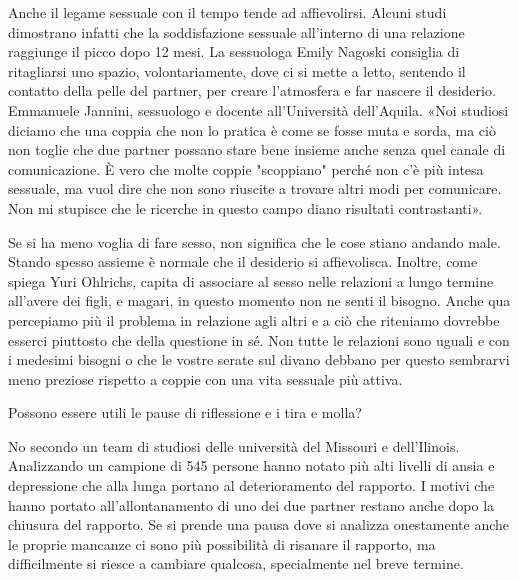\documentclass[12pt]{book} %
\begin{document}
Anche il legame sessuale con il tempo tende ad affievolirsi. Alcuni
studi dimostrano infatti che la soddisfazione sessuale all'interno di una relazione raggiunge il picco
dopo 12 mesi. 
La sessuologa Emily Nagoski
consiglia di ritagliarsi uno spazio, volontariamente, dove ci si mette a letto, sentendo il contatto della pelle del
partner, per creare l'atmosfera e far nascere il
desiderio.
Emmanuele Jannini, sessuologo e docente all'Università dell'Aquila. «Noi studiosi diciamo che una coppia che non lo pratica è come se fosse muta e sorda, ma ciò non toglie che due partner possano stare bene insieme anche senza quel canale di comunicazione. È vero che molte coppie "scoppiano" perché non c'è più intesa sessuale, ma vuol dire che non sono riuscite a trovare altri modi per comunicare. Non mi stupisce che le ricerche in questo campo diano risultati contrastanti».

Se si ha meno voglia di fare sesso, non significa che le cose stiano andando male. Stando spesso assieme è normale che
il desiderio si affievolisca. Inoltre, come spiega Yuri Ohlrichs, capita di associare al sesso nelle relazioni a lungo
termine all'avere dei figli, e magari, in questo momento non ne senti il bisogno. Anche qua
percepiamo più il problema in relazione agli altri e a ciò che riteniamo dovrebbe esserci piuttosto che della questione
in sé. Non tutte le relazioni sono uguali e con i medesimi bisogni o che le vostre serate sul divano debbano per questo
sembrarvi meno preziose rispetto a coppie con una vita sessuale più
attiva.

\begin{mdframed}[linewidth=1pt]
Possono essere utili le pause di riflessione e i tira e molla?

No secondo un team di studiosi delle università del Missouri e dell'Ilinois. Analizzando un campione di 545 persone
hanno notato più alti livelli di ansia e depressione che alla lunga portano al deterioramento del rapporto. I motivi
che hanno portato all'allontanamento di uno dei due partner restano anche dopo la chiusura del
rapporto. Se si prende una pausa dove si analizza onestamente anche le proprie mancanze ci sono più possibilità di
risanare il rapporto, ma difficilmente si riesce a cambiare qualcosa, specialmente nel breve termine. 
\end{mdframed}
\end{document}
